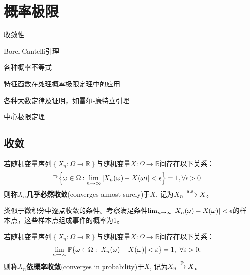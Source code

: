 \chapter{概率极限}\label{chap:limitation}
\begin{introduction}[考试重点]
    \item 收敛性
    \item Borel-Cantelli引理
    \item 各种概率不等式
    \item 特征函数在处理概率极限定理中的应用
    \item 各种大数定律及证明，如雷尔-康特立引理
    \item 中心极限定理
\end{introduction}
\section{收敛}

\begin{definition}
    若随机变量序列$\left\{ X_n: \Omega \to \mathbb{R} \right\}$与随机变量$X:\Omega \to \mathbb{R}$间存在以下关系：
    \[ \P\left\{ \omega \in \Omega: \lim_{n \to \infty}\abs{ X_n(\omega) - X(\omega)} < \epsilon \right\} =1, \forall \epsilon > 0\]
    则称$X_{n}$\textbf{几乎必然收敛}(converges almost surely)于$X$, 记为$X_{n} \xrightarrow{\as} X$。
\end{definition}

\begin{remark}
    类似于微积分中逐点收敛的条件。考察满足条件$\lim_{n \to \infty}\abs{ X_n(\omega) - X(\omega)} < \epsilon$的样本点，这些样本点组成事件的概率为1。
\end{remark}



\begin{definition}
    若随机变量序列$\left\{ X_n: \Omega \to \mathbb{R} \right\}$与随机变量$X:\Omega \to \mathbb{R}$间存在以下关系：
    \[ \lim_{n\to\infty}\P\{\omega \in \Omega: \abs{X_n(\omega) - X(\omega)}<\e\} = 1, \ \forall \e>0. \]
    则称$X_{n}$\textbf{依概率收敛}(converges in probability)于$X$, 记为$X_{n} \xrightarrow{\P} X$。
\end{definition}


